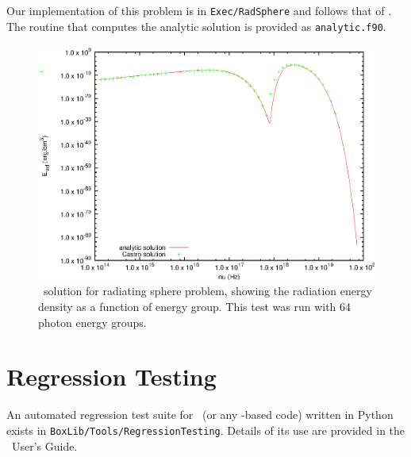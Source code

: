Our implementation of this problem is in {\tt Exec/RadSphere} and
follows that of \cite{swestymyra:2009}.  The routine that computes
the analytic solution is provided as {\tt analytic.f90}.

\begin{figure}[h]
\centering
\includegraphics[width=5.0in]{radiating_sphere}
\caption{\label{fig:radsphere} \castro\ solution for radiating sphere problem,
  showing the radiation energy density as a function of energy group.
  This test was run with 64 photon energy groups.}
\end{figure}


\section{Regression Testing}

An automated regression test suite for \castro\ (or any \boxlib-based
code) written in Python exists in {\tt BoxLib/Tools/RegressionTesting}.
Details of its use are provided in the \boxlib\ User's Guide.
